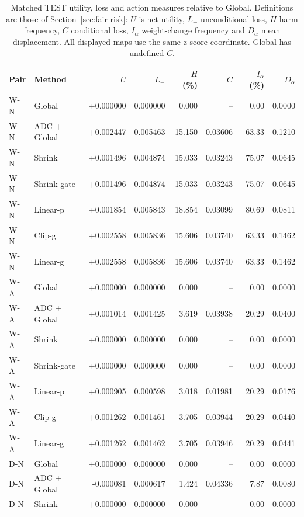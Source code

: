 \begin{table}[htbp]
\centering\footnotesize
\setlength{\tabcolsep}{4pt}
\caption{Matched TEST utility, loss and action measures relative to Global. Definitions are those of Section~\ref{sec:fair-risk}: $U$ is net utility, $L_-$ unconditional loss, $H$ harm frequency, $C$ conditional loss, $I_\alpha$ weight-change frequency and $D_\alpha$ mean displacement. All displayed maps use the same z-score coordinate. Global has undefined $C$.}
\label{tab:matched-risk}
\begin{tabular}{llrrrrrr}
\toprule
Pair & Method & $U$ & $L_-$ & $H$ (\%) & $C$ & $I_\alpha$ (\%) & $D_\alpha$\\
\midrule
W-N & Global & +0.000000 & 0.000000 & 0.000 & -- & 0.00 & 0.0000\\
W-N & ADC + Global & +0.002447 & 0.005463 & 15.150 & 0.03606 & 63.33 & 0.1210\\
W-N & Shrink & +0.001496 & 0.004874 & 15.033 & 0.03243 & 75.07 & 0.0645\\
W-N & Shrink-gate & +0.001496 & 0.004874 & 15.033 & 0.03243 & 75.07 & 0.0645\\
W-N & Linear-p & +0.001854 & 0.005843 & 18.854 & 0.03099 & 80.69 & 0.0811\\
W-N & Clip-g & +0.002558 & 0.005836 & 15.606 & 0.03740 & 63.33 & 0.1462\\
W-N & Linear-g & +0.002558 & 0.005836 & 15.606 & 0.03740 & 63.33 & 0.1462\\
\midrule
W-A & Global & +0.000000 & 0.000000 & 0.000 & -- & 0.00 & 0.0000\\
W-A & ADC + Global & +0.001014 & 0.001425 & 3.619 & 0.03938 & 20.29 & 0.0400\\
W-A & Shrink & +0.000000 & 0.000000 & 0.000 & -- & 0.00 & 0.0000\\
W-A & Shrink-gate & +0.000000 & 0.000000 & 0.000 & -- & 0.00 & 0.0000\\
W-A & Linear-p & +0.000905 & 0.000598 & 3.018 & 0.01981 & 20.29 & 0.0176\\
W-A & Clip-g & +0.001262 & 0.001461 & 3.705 & 0.03944 & 20.29 & 0.0440\\
W-A & Linear-g & +0.001262 & 0.001462 & 3.705 & 0.03946 & 20.29 & 0.0441\\
\midrule
D-N & Global & +0.000000 & 0.000000 & 0.000 & -- & 0.00 & 0.0000\\
D-N & ADC + Global & -0.000081 & 0.000617 & 1.424 & 0.04336 & 7.87 & 0.0080\\
D-N & Shrink & +0.000000 & 0.000000 & 0.000 & -- & 0.00 & 0.0000\\

\end{tabular}
\end{table}
